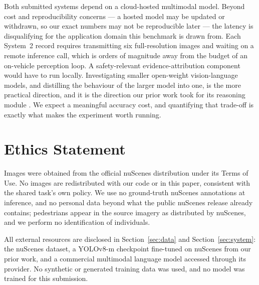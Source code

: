 \documentclass[11pt]{article}
\begin{document}
Both submitted systems depend on a cloud-hosted multimodal model. Beyond cost
and reproducibility concerns --- a hosted model may be updated or withdrawn,
so our exact numbers may not be reproducible later --- the latency is
disqualifying for the application domain this benchmark is drawn from. Each
System~2 record requires transmitting six full-resolution images and waiting on
a remote inference call, which is orders of magnitude away from the budget of
an on-vehicle perception loop. A safety-relevant evidence-attribution component
would have to run locally. Investigating smaller open-weight vision-language
models, and distilling the behaviour of the larger model into one, is the more
practical direction, and it is the direction our prior work took for its
reasoning module \citep{gaafar2025geodrive}. We expect a meaningful accuracy
cost, and quantifying that trade-off is exactly what makes the experiment
worth running.

\section*{Ethics Statement}

Images were obtained from the official nuScenes distribution under its Terms
of Use. No images are redistributed with our code or in this paper, consistent
with the shared task's own policy. We use no ground-truth nuScenes annotations
at inference, and no personal data beyond what the public nuScenes release
already contains; pedestrians appear in the source imagery as distributed by
nuScenes, and we perform no identification of individuals.

All external resources are disclosed in Section~\ref{sec:data} and
Section~\ref{sec:system}: the nuScenes dataset, a YOLOv8-m checkpoint
fine-tuned on nuScenes from our prior work, and a commercial multimodal
language model accessed through its provider. No synthetic or generated
training data was used, and no model was trained for this submission.


\end{document}
